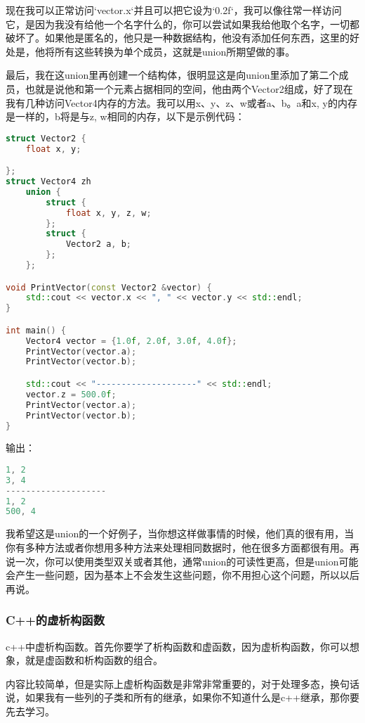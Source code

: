 现在我可以正常访问`vector.x`并且可以把它设为`0.2f`，我可以像往常一样访问它，是因为我没有给他一个名字什么的，你可以尝试如果我给他取个名字，一切都破坏了。如果他是匿名的，他只是一种数据结构，他没有添加任何东西，这里的好处是，他将所有这些转换为单个成员，这就是union所期望做的事。

最后，我在这union里再创建一个结构体，很明显这是向union里添加了第二个成员，也就是说他和第一个元素占据相同的空间，他由两个Vector2组成，好了现在我有几种访问Vector4内存的方法。我可以用x、y、z、w或者a、b。a和x, y的内存是一样的，b将是与z, w相同的内存，以下是示例代码：

\begin{lstlisting}[language=c++]
struct Vector2 {
    float x, y;

};
struct Vector4 zh
    union {
        struct {
            float x, y, z, w;
        };
        struct {
            Vector2 a, b;
        };
    };

void PrintVector(const Vector2 &vector) {
    std::cout << vector.x << ", " << vector.y << std::endl;
}

int main() {
    Vector4 vector = {1.0f, 2.0f, 3.0f, 4.0f};
    PrintVector(vector.a);
    PrintVector(vector.b);

    std::cout << "--------------------" << std::endl;
    vector.z = 500.0f;
    PrintVector(vector.a);
    PrintVector(vector.b);
}
\end{lstlisting}

输出：
\begin{lstlisting}[language=c++]
1, 2
3, 4
--------------------
1, 2
500, 4
\end{lstlisting}

我希望这是union的一个好例子，当你想这样做事情的时候，他们真的很有用，当你有多种方法或者你想用多种方法来处理相同数据时，他在很多方面都很有用。再说一次，你可以使用类型双关或者其他，通常union的可读性更高，但是union可能会产生一些问题，因为基本上不会发生这些问题，你不用担心这个问题，所以以后再说。



\subsubsection{C++的虚析构函数}

c++中虚析构函数。首先你要学了析构函数和虚函数，因为虚析构函数，你可以想象，就是虚函数和析构函数的组合。

内容比较简单，但是实际上虚析构函数是非常非常重要的，对于处理多态，换句话说，如果我有一些列的子类和所有的继承，如果你不知道什么是c++继承，那你要先去学习。

